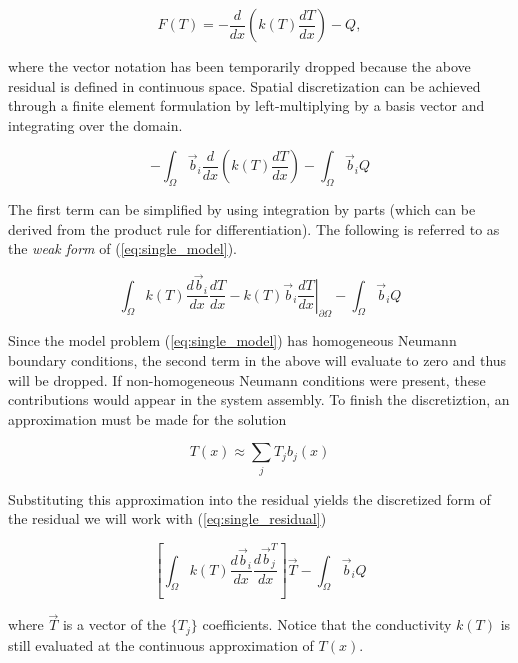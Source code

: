 \documentclass[11pt]{style/memo}
\begin{document}
\begin{equation*}
    F(T) = -\frac{d}{dx} \left( k(T) \frac{dT}{dx} \right) - Q,
\end{equation*}

where the vector notation has been temporarily dropped because the above residual is defined in
continuous space. Spatial discretization can be achieved through a finite element formulation by
left-multiplying by a basis vector and integrating over the domain.

\begin{equation*}
    - \int_\Omega \vec{b}_i \frac{d}{dx} \left( k(T) \frac{dT}{dx} \right) - \int_\Omega \vec{b}_i Q
\end{equation*}

The first term can be simplified by using integration by parts (which can be derived from the product
rule for differentiation). The following is referred to as the \emph{weak form} of (\ref{eq:single_model}).

\begin{equation}
    \int_\Omega k(T) \frac{d\vec{b}_i}{dx} \frac{dT}{dx}
    - \left. k(T) \vec{b}_i \frac{dT}{dx} \right|_{\partial\Omega}
    -\int_\Omega \vec{b}_i Q
    \label{eq:weak_form}
\end{equation}

Since the model problem (\ref{eq:single_model}) has homogeneous Neumann boundary conditions, the
second term in the above will evaluate to zero and thus will be dropped. If non-homogeneous Neumann
conditions were present, these contributions would appear in the system assembly. To finish the
discretiztion, an approximation must be made for the solution

\begin{equation*}
    T(x) \approx \sum_j T_j b_j(x)
\end{equation*}

Substituting this approximation into the residual yields the discretized form of the residual we
will work with (\ref{eq:single_residual})

\begin{equation}
    \left[ \int_\Omega k(T) \frac{d\vec{b}_i}{dx} \frac{d\vec{b}_j^T}{dx} \right] \vec{T}
    -\int_\Omega \vec{b}_i Q
    \label{eq:single_residual}
\end{equation}

where $\vec{T}$ is a vector of the $\{T_j\}$ coefficients. Notice that the conductivity $k(T)$ is
still evaluated at the continuous approximation of $T(x)$.
\end{document}
